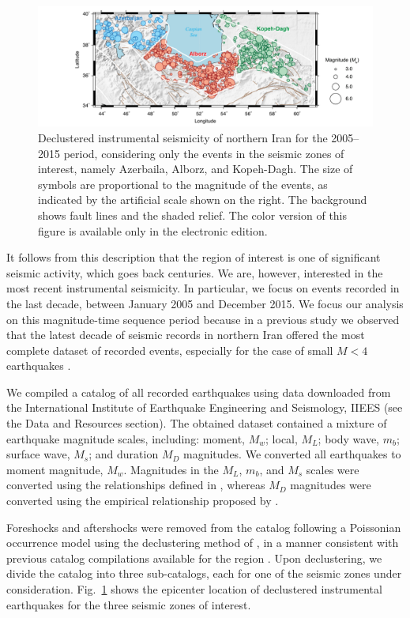 \begin{figure}[t]
	\centering
	\includegraphics[width=\textwidth]{figures/pdf/figure-03} 
	\caption{Declustered instrumental seismicity of northern Iran for the 2005--2015 period, considering only the events in the seismic zones of interest, namely Azerbaila, Alborz, and Kopeh-Dagh. The size of symbols are proportional to the magnitude of the events, as indicated by the artificial scale shown on the right. The background shows fault lines and the shaded relief. The color version of this figure is available only in the electronic edition.}
	\label{fig:seismicity}
\end{figure}

It follows from this description that the region of interest is one of significant seismic activity, which goes back centuries. We are, however, interested in the most recent instrumental seismicity. In particular, we focus on events recorded in the last decade, between January 2005 and December 2015. We focus our analysis on this magnitude-time sequence period because in a previous study we observed that the latest decade of seismic records in northern Iran offered the most complete dataset of recorded events, especially for the case of small $M < 4$ earthquakes \citep[e.g.][]{Khoshnevis2016}.

We compiled a catalog of all recorded earthquakes using data downloaded from the International Institute of Earthquake Engineering and Seismology, IIEES (see the Data and Resources section). The obtained dataset contained a mixture of earthquake magnitude scales, including: moment, $M_w$; local, $M_L$; body wave, $m_b$; surface wave, $M_s$; and duration $M_D$ magnitudes. We converted all earthquakes to moment magnitude, $M_w$. Magnitudes in the $M_L$, $m_b$, and $M_s$ scales were converted using the relationships defined in \citet{Zare2014}, whereas $M_D$ magnitudes were converted using the empirical relationship proposed by \citet{Deniz2010}.

Foreshocks and aftershocks were removed from the catalog following a Poissonian occurrence model using the declustering method of \citet{Gardner1974}, in a manner consistent with previous catalog compilations available for the region \citep[e.g.,][]{Zare2014}. Upon declustering, we divide the catalog into three sub-catalogs, each for one of the seismic zones under consideration. Fig.~\ref{fig:seismicity} shows the epicenter location of declustered instrumental earthquakes for the three seismic zones of interest.

